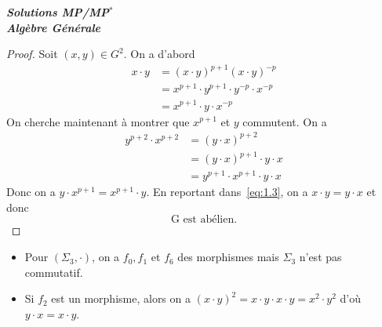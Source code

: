 \documentclass[12pt]{article}
\begin{document}
\begin{titlepage}
	\centering
	\vspace*{\fill}
	\Huge \textit{\textbf{Solutions MP/MP$^*$\\ Algèbre Générale}}
	\vspace*{\fill}
\end{titlepage}

\begin{proof}
	Soit $(x,y)\in G^{2}$. On a d'abord
	\begin{align}
		x\cdot y
		&=(x\cdot y)^{p+1}(x\cdot y)^{-p}\\
		&=x^{p+1}\cdot y^{p+1}\cdot y^{-p}\cdot x^{-p}\\
		&=x^{p+1}\cdot y \cdot x^{-p} \label{eq:1.3}
	\end{align}
	On cherche maintenant à montrer que $x^{p+1}$ et $y$ commutent.
	On a
	\begin{align}
		y^{p+2}\cdot x^{p+2}
		&=(y\cdot x)^{p+2}\\
		&=(y\cdot x)^{p+1}\cdot y\cdot x\\
		&=y^{p+1}\cdot x^{p+1}\cdot y\cdot x
	\end{align}
	Donc on a $y\cdot x^{p+1}=x^{p+1}\cdot y$. En reportant dans~\eqref{eq:1.3}, on a $x\cdot y=y\cdot x$ et donc 
	\begin{equation}
		\boxed{\text{G est abélien.}}
	\end{equation}
\end{proof}

\begin{remark}
	\phantom{}
	\begin{itemize}
		\item Pour $(\Sigma_{3},\cdot)$, on a $f_{0},f_{1}$ et $f_{6}$ des morphismes mais $\Sigma_{3}$ n'est pas commutatif.
		\item Si $f_{2}$ est un morphisme, alors on a $(x\cdot y)^{2}=x\cdot y\cdot x\cdot y=x^{2}\cdot y^{2}$ d'où $y\cdot x=x\cdot y$.
	\end{itemize}
\end{remark}
\end{document}
